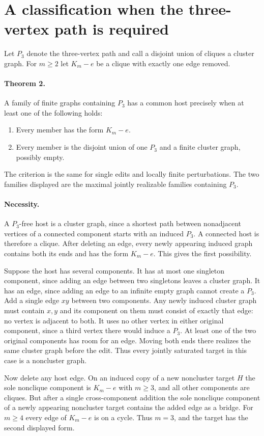 \documentclass[10pt]{article}
\begin{document}
\section{A classification when the three-vertex path is required}
Let $P_3$ denote the three-vertex path and call a disjoint union of cliques a cluster graph. For $m\ge2$ let $K_m-e$ be a clique with exactly one edge removed.

\paragraph{Theorem 2.} A family of finite graphs containing $P_3$ has a common host precisely when at least one of the following holds:
\begin{enumerate}
\item Every member has the form $K_m-e$.
\item Every member is the disjoint union of one $P_3$ and a finite cluster graph, possibly empty.
\end{enumerate}
The criterion is the same for single edits and locally finite perturbations. The two families displayed are the maximal jointly realizable families containing $P_3$.

\paragraph{Necessity.} A $P_3$-free host is a cluster graph, since a shortest path between nonadjacent vertices of a connected component starts with an induced $P_3$. A connected host is therefore a clique. After deleting an edge, every newly appearing induced graph contains both its ends and has the form $K_m-e$. This gives the first possibility.

Suppose the host has several components. It has at most one singleton component, since adding an edge between two singletons leaves a cluster graph. It has an edge, since adding an edge to an infinite empty graph cannot create a $P_3$. Add a single edge $xy$ between two components. Any newly induced cluster graph must contain $x,y$ and its component on them must consist of exactly that edge: no vertex is adjacent to both. It uses no other vertex in either original component, since a third vertex there would induce a $P_3$. At least one of the two original components has room for an edge. Moving both ends there realizes the same cluster graph before the edit. Thus every jointly saturated target in this case is a noncluster graph.

Now delete any host edge. On an induced copy of a new noncluster target $H$ the sole nonclique component is $K_m-e$ with $m\ge3$, and all other components are cliques. But after a single cross-component addition the sole nonclique component of a newly appearing noncluster target contains the added edge as a bridge. For $m\ge4$ every edge of $K_m-e$ is on a cycle. Thus $m=3$, and the target has the second displayed form.
\end{document}
